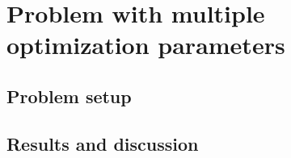 \section{Problem with multiple optimization parameters}

\subsection{Problem setup}

\subsection{Results and discussion}